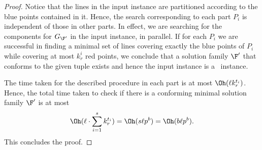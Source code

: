 \begin{proof}
Notice that the lines in the input instance are partitioned according to the blue points contained in it. Hence, the search corresponding to each part $P_i$ is independent of those in other parts. In effect, we are searching for the components for $G_{\F'}$ in the input instance, in parallel. If for each $P_i$ we are successful in finding a minimal set of lines covering exactly the blue points of $P_i$ while covering at most $k_r^i$ red points, we conclude that a solution family $\F'$ that conforms to the given tuple exists and hence the input instance is a \YES\ instance.

The time taken for the described procedure in each part is at most $\Oh(\ell k_r^{t_i})$. Hence, the total time taken to check if there is a conforming minimal solution family $\F'$ is at most 
$$ \Oh(\ell \cdot \sum_{i=1}^s k_r^{t_i})=  \Oh(s \ell   p^b)=\Oh(b \ell p^b).$$ 
This concludes the proof. 
\end{proof}


